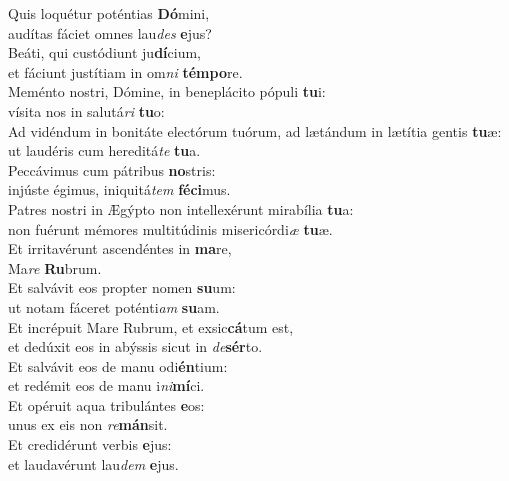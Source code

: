 \evenverse Quis loquétur poténtias \textbf{Dó}mini,~\*\\
\evenverse audítas fáciet omnes lau\textit{des} \textbf{e}jus?\\
\oddverse Beáti, qui custódiunt ju\textbf{dí}cium,~\*\\
\oddverse et fáciunt justítiam in om\textit{ni} \textbf{tém}\textbf{po}re.\\
\evenverse Meménto nostri, Dómine, in beneplácito pópuli \textbf{tu}i:~\*\\
\evenverse vísita nos in salutá\textit{ri} \textbf{tu}o:\\
\oddverse Ad vidéndum in bonitáte electórum tuórum, ad lætándum in lætítia gentis \textbf{tu}æ:~\*\\
\oddverse ut laudéris cum hereditá\textit{te} \textbf{tu}a.\\
\evenverse Peccávimus cum pátribus \textbf{no}stris:~\*\\
\evenverse injúste égimus, iniquitá\textit{tem} \textbf{fé}\textbf{ci}mus.\\
\oddverse Patres nostri in Ægýpto non intellexérunt mirabília \textbf{tu}a:~\*\\
\oddverse non fuérunt mémores multitúdinis misericórdi\textit{æ} \textbf{tu}æ.\\
\evenverse Et irritavérunt ascendéntes in \textbf{ma}re,~\*\\
\evenverse Ma\textit{re} \textbf{Ru}brum.\\
\oddverse Et salvávit eos propter nomen \textbf{su}um:~\*\\
\oddverse ut notam fáceret poténti\textit{am} \textbf{su}am.\\
\evenverse Et incrépuit Mare Rubrum, et exsic\textbf{cá}tum est,~\*\\
\evenverse et dedúxit eos in abýssis sicut in \textit{de}\textbf{sér}to.\\
\oddverse Et salvávit eos de manu odi\textbf{én}tium:~\*\\
\oddverse et redémit eos de manu i\textit{ni}\textbf{mí}ci.\\
\evenverse Et opéruit aqua tribulántes \textbf{e}os:~\*\\
\evenverse unus ex eis non \textit{re}\textbf{mán}sit.\\
\oddverse Et credidérunt verbis \textbf{e}jus:~\*\\
\oddverse et laudavérunt lau\textit{dem} \textbf{e}jus.\\

